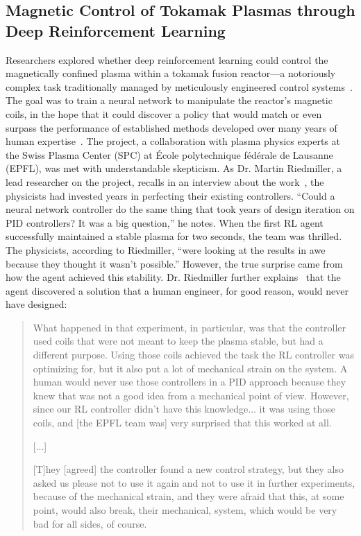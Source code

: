 \subsection{Magnetic Control of Tokamak Plasmas through Deep Reinforcement Learning~\citep{Degrave2022tokamak, TalkRL_Riedmiller_2023}}
\label{sec:fusion}

Researchers explored whether deep reinforcement learning could control the magnetically confined plasma within a tokamak fusion reactor---a notoriously complex task traditionally managed by meticulously engineered control systems~\citep{Walker01112006tokomak}. 
The goal was to train a neural network to manipulate the reactor's magnetic coils, in the hope that it could discover a policy that would match or even surpass the performance of established methods developed over many years of human expertise~\citep{Wesson2011tokamak}.
The project, a collaboration with plasma physics experts at the Swiss Plasma Center (SPC) at \'Ecole polytechnique f\'ed\'erale de Lausanne (EPFL), was met with understandable skepticism.
As Dr. Martin Riedmiller, a lead researcher on the project, recalls in an interview about the work~\citep{TalkRL_Riedmiller_2023}, the physicists had invested years in perfecting their existing controllers. 
``Could a neural network controller do the same thing that took years of design iteration on PID controllers? It was a big question,'' he notes. When the first RL agent successfully maintained a stable plasma for two seconds, the team was thrilled. The physicists, according to Riedmiller, ``were looking at the results in awe because they thought it wasn't possible.''
However, the true surprise came from how the agent achieved this stability. Dr. Riedmiller further explains~\citep{TalkRL_Riedmiller_2023} that the agent discovered a solution that a human engineer, for good reason, would never have designed:

\begin{quote}
What happened in that experiment, in particular, was that the controller used coils that were not meant to keep the plasma stable, but had a different purpose. Using those coils achieved the task the RL controller was optimizing for, but it also put a lot of mechanical strain on the system. A human would never use those controllers in a PID approach because they knew that was not a good idea from a mechanical point of view. However, since our RL controller didn't have this knowledge... it was using those coils, and [the EPFL team was] very surprised that this worked at all.

[...]

[T]hey [agreed] the controller found a new control strategy, but they also asked us please not to use it again and not to use it in further experiments, because of the mechanical strain, and they were afraid that this, at some point, would also break, their mechanical, system, which would be very bad for all sides, of course.
\end{quote}

